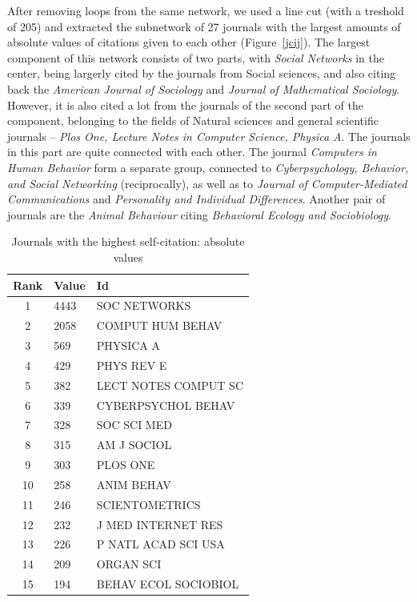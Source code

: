 \documentclass[11pt]{article} %
\begin{document}
After removing loops from the same network, we used a line cut (with a treshold of 205) and extracted the subnetwork of 27 journals with the largest amounts of absolute values of citations given to each other (Figure~\ref{jcij}). The largest component of this network consists of two parts, with \textit{Social Networks} in the center, being largerly cited by the journals from Social sciences, and also citing back the \textit{American Journal of Sociology} and \textit{Journal of Mathematical Sociology}. However, it is also cited a lot from the journals of the second part of the component, belonging to the fields of Natural sciences and general scientific journals -- \textit{Plos One, Lecture Notes in Computer Science, Physica A}. The journals in this part are quite connected with each other. The journal \textit{Computers in Human Behavior} form a separate group, connected to \textit{Cyberpsychology, Behavior, and Social Networking} (reciprocally), as well as to \textit{Journal of Computer-Mediated Communications} and \textit{Personality and Individual Differences}. Another pair of journals are the \textit{Animal Behaviour} citing \textit{Behavioral Ecology and Sociobiology}. 

\begin{table}
\caption{Journals with the highest self-citation: absolute values} \label{jjloops}\medskip
\renewcommand{\arraystretch}{0.95}
\small
\begin{center}
\begin{tabular}{c|l|l} 
 Rank       &        Value   & Id		    \\ \hline 
         1  &    4443   & SOC NETWORKS		    \\
         2  &    2058   & COMPUT HUM BEHAV	    \\
         3  &     569   & PHYSICA A		    \\
         4  &     429   & PHYS REV E		    \\
         5  &     382   & LECT NOTES COMPUT SC	    \\
         6  &     339   & CYBERPSYCHOL BEHAV	    \\
         7  &     328   & SOC SCI MED		    \\
         8  &     315   & AM J SOCIOL		    \\
         9  &     303   & PLOS ONE		    \\
        10  &     258   & ANIM BEHAV		    \\
        11  &     246   & SCIENTOMETRICS	    \\
        12  &     232   & J MED INTERNET RES	    \\
        13  &     226   & P NATL ACAD SCI USA	    \\
        14  &     209   & ORGAN SCI		    \\
        15  &     194    & BEHAV ECOL SOCIOBIOL	     \\ \hline 
\end{tabular} 
\end{center}
\end{table}  
\end{document}
